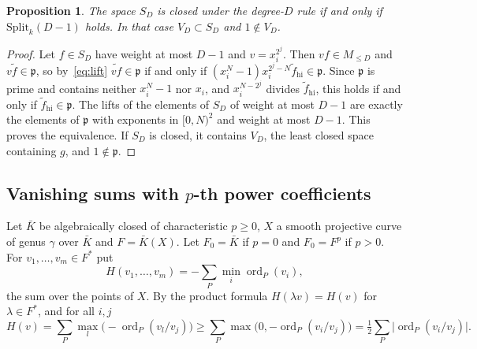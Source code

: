 \documentclass[11pt]{article}
\newtheorem{proposition}[theorem]{Proposition}
\theoremstyle{definition}\newtheorem{definition}[theorem]{Definition}
\theoremstyle{remark}\newtheorem{remark}[theorem]{Remark}
\begin{document}
\begin{proposition}\label{prop:feired}
The space $S_D$ is closed under the degree-$D$ rule if and only if
$\mathrm{Split}_k(D-1)$ holds. In that case $V_D\subset S_D$ and
$1\notin V_D$.
\end{proposition}
\begin{proof}
Let $f\in S_D$ have weight at most $D-1$ and $v=x_i^{2^j}$. Then
$vf\in M_{\le D}$ and $v\tilde f\in\mathfrak p$, so by~\eqref{eq:lift}
$\widetilde{vf}\in\mathfrak p$ if and only if
$(x_i^N-1)x_i^{2^j-N}\tilde f_{\mathrm{hi}}\in\mathfrak p$. Since
$\mathfrak p$ is prime and contains neither $x_i^N-1$ nor $x_i$, and
$x_i^{N-2^j}$ divides $\tilde f_{\mathrm{hi}}$, this holds if and only if
$\tilde f_{\mathrm{hi}}\in\mathfrak p$. The lifts of the elements of $S_D$
of weight at most $D-1$ are exactly the elements of $\mathfrak p$ with
exponents in $[0,N)^2$ and weight at most $D-1$. This proves the
equivalence. If $S_D$ is closed, it contains $V_D$, the least closed
space containing $g$, and $1\notin\mathfrak p$.
\end{proof}

\subsection{Vanishing sums with \texorpdfstring{$p$}{p}-th power coefficients}\label{app:growthwronskian}
Let $\bar K$ be algebraically closed of characteristic $p\ge0$, $X$ a
smooth projective curve of genus $\gamma$ over $\bar K$ and $F=\bar K(X)$.
Let $F_0=\bar K$ if $p=0$ and $F_0=F^p$ if $p>0$. For
$v_1,\ldots,v_m\in F^*$ put
\[
 H(v_1,\ldots,v_m)=-\sum_{P}\min_i\operatorname{ord}_P(v_i),
\]
the sum over the points of $X$. By the product formula
$H(\lambda v)=H(v)$ for $\lambda\in F^*$, and for all $i,j$
\begin{equation}\label{eq:heightpair}
 H(v)=\sum_P\max_l\bigl(-\operatorname{ord}_P(v_l/v_j)\bigr)
 \ge\sum_P\max\bigl(0,-\operatorname{ord}_P(v_i/v_j)\bigr)
 =\tfrac12\sum_P\bigl|\operatorname{ord}_P(v_i/v_j)\bigr| .
\end{equation}
\end{document}
